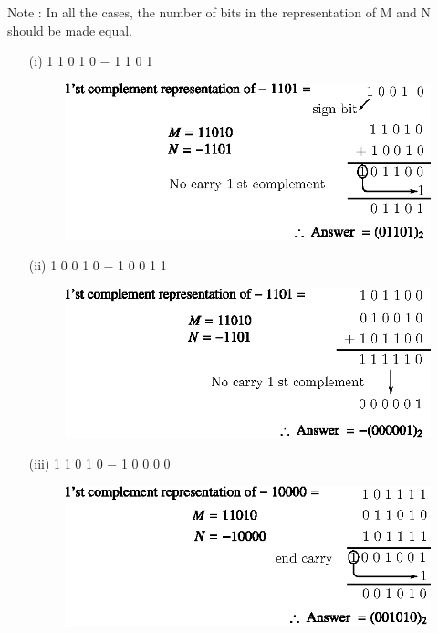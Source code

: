\begin{solution}
Note : In all the cases, the number of bits in the representation of M and N should be made equal.
\begin{itemize}
\item[(i)] 1 1 0 1 0 $-$ 1 1 0 1
\begin{figure}[H]
\centering
\includegraphics{chap5/div34.eps}
\end{figure}

\item[(ii)] 1 0 0 1 0 $-$ 1 0 0 1 1
\begin{figure}[H]
\centering
\includegraphics{chap5/div35.eps}
\end{figure}

\item[(iii)] 1 1 0 1 0 $-$ 1 0 0 0 0
\begin{figure}[H]
\centering
\includegraphics{chap5/div36.eps}
\end{figure}


\end{itemize}
\end{solution}
